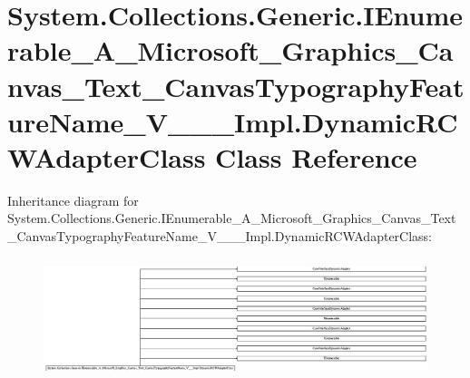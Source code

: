 \hypertarget{class_system_1_1_collections_1_1_generic_1_1_i_enumerable___a___microsoft___graphics___canvas___f18f2717b01ec19c570706274e0d2fc8}{}\section{System.\+Collections.\+Generic.\+I\+Enumerable\+\_\+\+A\+\_\+\+Microsoft\+\_\+\+Graphics\+\_\+\+Canvas\+\_\+\+Text\+\_\+\+Canvas\+Typography\+Feature\+Name\+\_\+\+V\+\_\+\+\_\+\+\_\+\+Impl.\+Dynamic\+R\+C\+W\+Adapter\+Class Class Reference}
\label{class_system_1_1_collections_1_1_generic_1_1_i_enumerable___a___microsoft___graphics___canvas___f18f2717b01ec19c570706274e0d2fc8}
Inheritance diagram for System.\+Collections.\+Generic.\+I\+Enumerable\+\_\+\+A\+\_\+\+Microsoft\+\_\+\+Graphics\+\_\+\+Canvas\+\_\+\+Text\+\_\+\+Canvas\+Typography\+Feature\+Name\+\_\+\+V\+\_\+\+\_\+\+\_\+\+Impl.\+Dynamic\+R\+C\+W\+Adapter\+Class\+:\begin{figure}[H]
\begin{center}
\leavevmode
\includegraphics[height=3.528064cm]{class_system_1_1_collections_1_1_generic_1_1_i_enumerable___a___microsoft___graphics___canvas___f18f2717b01ec19c570706274e0d2fc8}
\end{center}
\end{figure}
